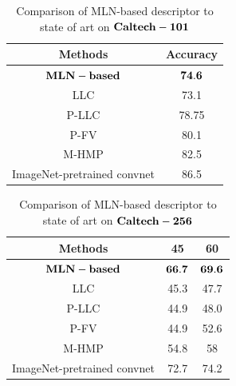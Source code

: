 \documentclass[journal]{IEEEtran}
\begin{document}
\begin{table}[!t]
\caption{Comparison of MLN-based descriptor to state of art on $\bf{Caltech-101}$}
\begin{center}
\begin{tabular}{|c|c|}
\hline
Methods & Accuracy \\
\hline
$\bf{MLN-based}$ & $\bf{74.6}$ \\
\hline
LLC & 73.1 \\
\hline
P-LLC & 78.75\\
\hline
P-FV & 80.1\\
\hline
M-HMP & 82.5 \\
\hline
ImageNet-pretrained convnet & 86.5 \\
\hline
\end{tabular}
\end{center}
\end{table}

\begin{table}[!t]
\caption{Comparison of MLN-based descriptor to state of art on $\bf{Caltech-256}$}
\begin{center}
\begin{tabular}{|c|c|c|}
\hline
Methods & 45 & 60 \\
\hline
$\bf{MLN-based}$ & $\bf{66.7}$ & $\bf{69.6}$ \\
\hline
LLC &  45.3 & 47.7\\
\hline
P-LLC & 44.9 & 48.0\\
\hline
P-FV & 44.9 & 52.6\\
\hline
M-HMP & 54.8 & 58 \\
\hline
ImageNet-pretrained convnet & 72.7 & 74.2 \\
\hline
\end{tabular}
\end{center}
\end{table}
\end{document}
